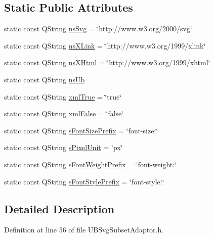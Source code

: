 \subsection*{Static Public Attributes}
\begin{DoxyCompactItemize}
\item 
static const Q\-String \hyperlink{class_u_b_svg_subset_adaptor_a407409ee2324e304a9c2404eb8965b05}{ns\-Svg} = \char`\"{}http\-://www.\-w3.\-org/2000/svg\char`\"{}
\item 
static const Q\-String \hyperlink{class_u_b_svg_subset_adaptor_a9a1c2bd95b31f64b43fda8acc13e2a21}{ns\-X\-Link} = \char`\"{}http\-://www.\-w3.\-org/1999/xlink\char`\"{}
\item 
static const Q\-String \hyperlink{class_u_b_svg_subset_adaptor_a3448a034e9c845f9c0ce1c3c87f8cc77}{ns\-X\-Html} = \char`\"{}http\-://www.\-w3.\-org/1999/xhtml\char`\"{}
\item 
static const Q\-String \hyperlink{class_u_b_svg_subset_adaptor_abaaf7694f1e36b620703f0adc2385967}{ns\-Ub}
\item 
static const Q\-String \hyperlink{class_u_b_svg_subset_adaptor_ad5460226f2e1c56cd3b7db062fe7c0da}{xml\-True} = \char`\"{}true\char`\"{}
\item 
static const Q\-String \hyperlink{class_u_b_svg_subset_adaptor_a1adfffd7e1374c84381c932b0e15e218}{xml\-False} = \char`\"{}false\char`\"{}
\item 
static const Q\-String \hyperlink{class_u_b_svg_subset_adaptor_ade20b66dff8586c2a270fc0ec0e37140}{s\-Font\-Size\-Prefix} = \char`\"{}font-\/size\-:\char`\"{}
\item 
static const Q\-String \hyperlink{class_u_b_svg_subset_adaptor_a3d5cad8803cfd188f7849d59d6bd6d9c}{s\-Pixel\-Unit} = \char`\"{}px\char`\"{}
\item 
static const Q\-String \hyperlink{class_u_b_svg_subset_adaptor_ac9df97e19b9bfd3de1064adae0b371f8}{s\-Font\-Weight\-Prefix} = \char`\"{}font-\/weight\-:\char`\"{}
\item 
static const Q\-String \hyperlink{class_u_b_svg_subset_adaptor_a67a360fb9d747e9f3dc05022be5a6f29}{s\-Font\-Style\-Prefix} = \char`\"{}font-\/style\-:\char`\"{}
\end{DoxyCompactItemize}


\subsection{Detailed Description}


Definition at line 56 of file U\-B\-Svg\-Subset\-Adaptor.\-h.




